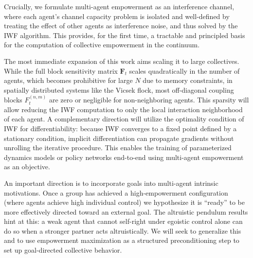 \documentclass{article} %
\begin{document}
Crucially, we formulate multi-agent empowerment as an interference
channel, where each agent's channel capacity problem is isolated and
well-defined by treating the effect of other agents as interference
noise, and thus solved by the IWF algorithm. This provides, for the
first time, a tractable and principled basis for the computation of
collective empowerment in the continuum.

The most immediate expansion of this work aims scaling it to large
collectives. While the full block sensitivity matrix $\mathbf{F}_t$
scales quadratically in the number of agents, which becomes
prohibitive for large $N$ due to memory constraints, in spatially
distributed systems like the Vicsek flock, most off-diagonal coupling
blocks $F_t^{(n,m)}$ are zero or negligible for non-neighboring
agents. This sparsity will allow reducing the IWF computation to only
the local interaction neighborhood of each agent. A complementary
direction will utilize the optimality condition of IWF for
differentiability: because IWF converges to a fixed point defined by a
stationary condition, implicit differentiation can propagate gradients
without unrolling the iterative procedure. This enables the training
of parameterized dynamics models or policy networks end-to-end using
multi-agent empowerment as an objective.

An important direction is to incorporate goals into multi-agent
intrinsic motivations. Once a group has achieved a
high-empowerment configuration (where agents achieve high individual
control) we hypothesize it is ``ready'' to be more effectively
directed toward an external goal. The altruistic pendulum results hint
at this: a weak agent that cannot self-right under egoistic control
alone can do so when a stronger partner acts altruistically. We will
seek to generalize this and to use empowerment maximization as a
structured preconditioning step to set up goal-directed collective
behavior.





\end{document}
